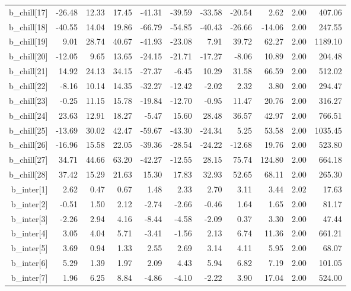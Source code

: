 \documentclass[11pt]{article}
\begin{document}
\begin{table}[ht]
\begin{tabular}{rrrrrrrrrrr}
  b\_chill[17] & -26.48 & 12.33 & 17.45 & -41.31 & -39.59 & -33.58 & -20.54 & 2.62 & 2.00 & 407.06 \\ 
  b\_chill[18] & -40.55 & 14.04 & 19.86 & -66.79 & -54.85 & -40.43 & -26.66 & -14.06 & 2.00 & 247.55 \\ 
  b\_chill[19] & 9.01 & 28.74 & 40.67 & -41.93 & -23.08 & 7.91 & 39.72 & 62.27 & 2.00 & 1189.10 \\ 
  b\_chill[20] & -12.05 & 9.65 & 13.65 & -24.15 & -21.71 & -17.27 & -8.06 & 10.89 & 2.00 & 204.48 \\ 
  b\_chill[21] & 14.92 & 24.13 & 34.15 & -27.37 & -6.45 & 10.29 & 31.58 & 66.59 & 2.00 & 512.02 \\ 
  b\_chill[22] & -8.16 & 10.14 & 14.35 & -32.27 & -12.42 & -2.02 & 2.32 & 3.80 & 2.00 & 294.47 \\ 
  b\_chill[23] & -0.25 & 11.15 & 15.78 & -19.84 & -12.70 & -0.95 & 11.47 & 20.76 & 2.00 & 316.27 \\ 
  b\_chill[24] & 23.63 & 12.91 & 18.27 & -5.47 & 15.60 & 28.48 & 36.57 & 42.97 & 2.00 & 766.51 \\ 
  b\_chill[25] & -13.69 & 30.02 & 42.47 & -59.67 & -43.30 & -24.34 & 5.25 & 53.58 & 2.00 & 1035.45 \\ 
  b\_chill[26] & -16.96 & 15.58 & 22.05 & -39.36 & -28.54 & -24.22 & -12.68 & 19.76 & 2.00 & 523.80 \\ 
  b\_chill[27] & 34.71 & 44.66 & 63.20 & -42.27 & -12.55 & 28.15 & 75.74 & 124.80 & 2.00 & 664.18 \\ 
  b\_chill[28] & 37.42 & 15.29 & 21.63 & 15.30 & 17.83 & 32.93 & 52.65 & 68.11 & 2.00 & 265.30 \\ 
  b\_inter[1] & 2.62 & 0.47 & 0.67 & 1.48 & 2.33 & 2.70 & 3.11 & 3.44 & 2.02 & 17.63 \\ 
  b\_inter[2] & -0.51 & 1.50 & 2.12 & -2.74 & -2.66 & -0.46 & 1.64 & 1.65 & 2.00 & 81.17 \\ 
  b\_inter[3] & -2.26 & 2.94 & 4.16 & -8.44 & -4.58 & -2.09 & 0.37 & 3.30 & 2.00 & 47.44 \\ 
  b\_inter[4] & 3.05 & 4.04 & 5.71 & -3.41 & -1.56 & 2.13 & 6.74 & 11.36 & 2.00 & 661.21 \\ 
  b\_inter[5] & 3.69 & 0.94 & 1.33 & 2.55 & 2.69 & 3.14 & 4.11 & 5.95 & 2.00 & 68.07 \\ 
  b\_inter[6] & 5.29 & 1.39 & 1.97 & 2.09 & 4.43 & 5.94 & 6.82 & 7.19 & 2.00 & 101.05 \\ 
  b\_inter[7] & 1.96 & 6.25 & 8.84 & -4.86 & -4.10 & -2.22 & 3.90 & 17.04 & 2.00 & 524.00 \\ 

\end{tabular}
\end{table}
\end{document}
